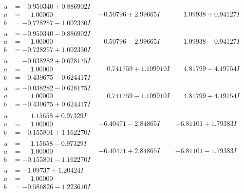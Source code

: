\documentclass[1p]{elsarticle_modified}
\theoremstyle{definition}
\begin{document}
$$\begin{array}{c|c|c}
\begin{aligned}
u &= -0.950340 + 0.886902 I \\
a &= \phantom{-}1.00000\phantom{ +0.000000I} \\
b &= -0.728257 - 1.002330 I\end{aligned}
 & -0.50796 + 2.99665 I & \phantom{-}1.09938 + 0.94127 I \\ \hline\begin{aligned}
u &= -0.950340 - 0.886902 I \\
a &= \phantom{-}1.00000\phantom{ +0.000000I} \\
b &= -0.728257 + 1.002330 I\end{aligned}
 & -0.50796 - 2.99665 I & \phantom{-}1.09938 - 0.94127 I \\ \hline\begin{aligned}
u &= -0.038282 + 0.628175 I \\
a &= \phantom{-}1.00000\phantom{ +0.000000I} \\
b &= -0.439675 - 0.624417 I\end{aligned}
 & \phantom{-}0.741759 + 1.109910 I & \phantom{-}4.81799 - 4.19754 I \\ \hline\begin{aligned}
u &= -0.038282 - 0.628175 I \\
a &= \phantom{-}1.00000\phantom{ +0.000000I} \\
b &= -0.439675 + 0.624417 I\end{aligned}
 & \phantom{-}0.741759 - 1.109910 I & \phantom{-}4.81799 + 4.19754 I \\ \hline\begin{aligned}
u &= \phantom{-}1.15658 + 0.97329 I \\
a &= \phantom{-}1.00000\phantom{ +0.000000I} \\
b &= -0.155801 + 1.162270 I\end{aligned}
 & -6.40471 - 2.84865 I & -6.81101 + 1.79383 I \\ \hline\begin{aligned}
u &= \phantom{-}1.15658 - 0.97329 I \\
a &= \phantom{-}1.00000\phantom{ +0.000000I} \\
b &= -0.155801 - 1.162270 I\end{aligned}
 & -6.40471 + 2.84865 I & -6.81101 - 1.79383 I \\ \hline\begin{aligned}
u &= -1.09737 + 1.20424 I \\
a &= \phantom{-}1.00000\phantom{ +0.000000I} \\
b &= -0.586826 - 1.223610 I\end{aligned}

\end{array}$$
\end{document}
